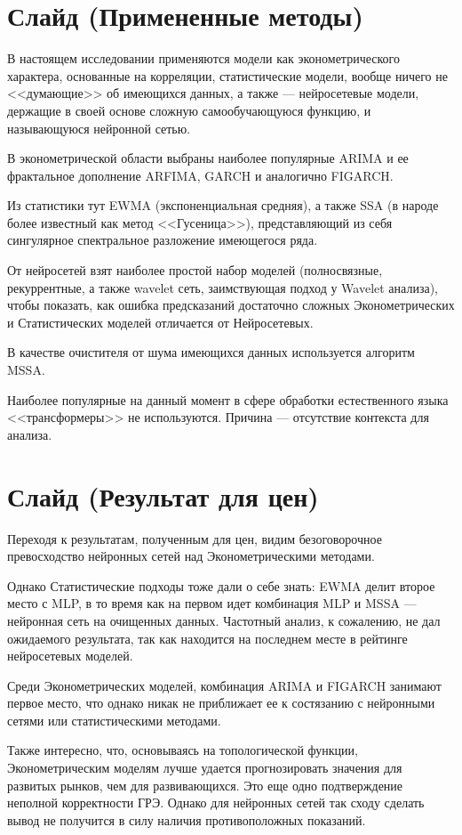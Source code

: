 \documentclass[a4paper, 12pt]{article}
\begin{document}
	\section{Слайд (Примененные методы)}
		В настоящем исследовании применяются модели как эконометрического характера, основанные на корреляции, статистические модели, вообще ничего не <<думающие>> об имеющихся данных, а также --- нейросетевые модели, держащие в своей основе сложную самообучающуюся функцию, и называющуюся нейронной сетью. 
		
		В эконометрической области выбраны наиболее популярные ARIMA и ее фрактальное дополнение ARFIMA, GARCH и аналогично FIGARCH.
		
		Из статистики тут EWMA (экспоненциальная средняя), а также SSA (в народе более известный как метод <<Гусеница>>), представляющий из себя сингулярное спектральное разложение имеющегося ряда.
		
		От нейросетей взят наиболее простой набор моделей (полносвязные, рекуррентные, а также wavelet сеть, заимствующая подход у Wavelet анализа), чтобы показать, как ошибка предсказаний достаточно сложных Эконометрических и Статистических моделей отличается от Нейросетевых.
		
		В качестве очистителя от шума имеющихся данных используется алгоритм MSSA.
		
		Наиболее популярные на данный момент в сфере обработки естественного языка <<трансформеры>> не используются. Причина --- отсутствие контекста для анализа.
	\section{Слайд (Результат для цен)}
		Переходя к результатам, полученным для цен, видим безоговорочное превосходство нейронных сетей над Эконометрическими методами. 
		
		Однако Статистические подходы тоже дали о себе знать: EWMA делит второе место с MLP, в то время как на первом идет комбинация MLP и MSSA --- нейронная сеть на очищенных данных. Частотный анализ, к сожалению, не дал ожидаемого результата, так как находится на последнем месте в рейтинге нейросетевых моделей. 

		Среди Эконометрических моделей, комбинация ARIMA и FIGARCH занимают первое место, что однако никак не приближает ее к состязанию с нейронными сетями или статистическими методами.
		 
		Также интересно, что, основываясь на топологической функции, Эконометрическим моделям лучше удается прогнозировать значения для развитых рынков, чем для развивающихся. Это еще одно подтверждение неполной корректности ГРЭ. Однако для нейронных сетей так сходу сделать вывод не получится в силу наличия противоположных показаний.
		
\end{document}
